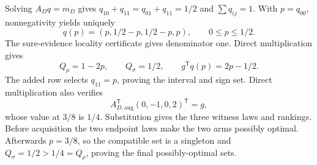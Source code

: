 Solving \(A_Dq=m_D\) gives \(q_{10}+q_{11}=q_{01}+q_{11}=1/2\) and \(\sum q_{ij}=1\).  With \(p=q_{00}\), nonnegativity yields uniquely
\[
q(p)=(p,1/2-p,1/2-p,p),\qquad0\le p\le1/2.
\]
The sure-evidence locality certificate gives denominator one.  Direct multiplication gives
\[
Q_\rho=1-2p,\qquad Q_\sigma=1/2,\qquad g^{\mathsf T}q(p)=2p-1/2.
\]
The added row selects \(q_{11}=p\), proving the interval and sign set.  Direct multiplication also verifies
\[
A_{D,\mathrm{aug}}^{\mathsf T}(0,-1,0,2)^{\mathsf T}=g,
\]
whose value at \(3/8\) is \(1/4\).  Substitution gives the three witness laws and rankings.  Before acquisition the two endpoint laws make the two arms possibly optimal.  Afterwards \(p=3/8\), so the compatible set is a singleton and \(Q_\sigma=1/2>1/4=Q_\rho\), proving the final possibly-optimal sets.